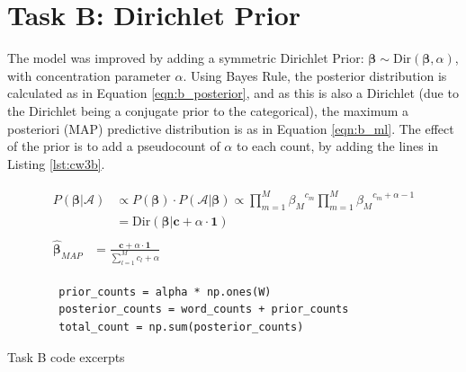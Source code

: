 \documentclass[11pt]{amsart}
\begin{document}
\vspace*{-0.5cm}
\section{Task B: Dirichlet Prior} \label{sec:b}
The model was improved by adding a symmetric Dirichlet Prior: $\bm{\beta} \sim \mathrm{Dir}(\bm{\beta}, \alpha)$, with concentration parameter $\alpha$. Using Bayes Rule, the posterior distribution is calculated as in Equation \ref{eqn:b_posterior}, and as this is also a Dirichlet (due to the Dirichlet being a conjugate prior to the categorical), the maximum a posteriori (MAP) predictive distribution is as in Equation \ref{eqn:b_ml}. The effect of the prior is to add a pseudocount of $\alpha$ to each count, by adding the lines in Listing \ref{lst:cw3b}.

\vspace{-0.1cm}
\small
\begin{align}
    \begin{split} \label{eqn:b_posterior}
        P(\bm{\beta} \vert \mathcal{A}) & \propto  P(\bm{\beta}) \cdot P(\mathcal{A} \vert \bm{\beta}) \propto \prod_{m=1}^{M} {\beta_{M}}^{c_m}\prod_{m=1}^{M} {\beta_{M}}^{c_m+\alpha-1} \\
                                        & = \mathrm{Dir} (\bm{\beta}\vert \bm{c} + \alpha \cdot \mathbf{1})
    \end{split} \\
    \begin{split} \label{eqn:b_ml}
        \hat{\bm{\beta}}_{MAP} & = \frac{\bm{c} + \alpha\cdot\mathbf{1}}{\sum_{l=1}^{M}c_l + \alpha}
    \end{split}
\end{align}
\normalsize


\begin{listing}[h]
    \begin{verbatim}
        prior_counts = alpha * np.ones(W)
        posterior_counts = word_counts + prior_counts
        total_count = np.sum(posterior_counts)
    \end{verbatim}
    \caption{Task B code excerpts} \label{lst:cw3b}
\end{listing}
\end{document}
